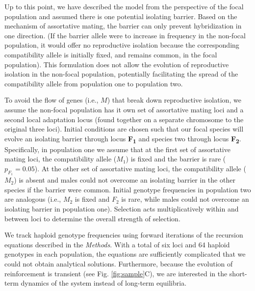 \documentclass[11pt]{article}
\begin{document}
Up to this point, we have described the model from the perspective of the focal population and assumed there is one potential isolating barrier. Based on the mechanism of assortative mating, the barrier can only prevent hybridization in one direction. (If the barrier allele were to increase in frequency in the non-focal population, it would offer no reproductive isolation because the corresponding compatibility allele is initially fixed, and remains common, in the focal population). This formulation does not allow the evolution of reproductive isolation in the non-focal population, potentially facilitating the spread of the compatibility allele from population one to population two. 

To avoid the flow of genes (i.e., $M$) that break down reproductive isolation, we assume the non-focal population has it own set of assortative mating loci and a second local adaptation locus (found together on a separate chromosome to the original three loci). Initial conditions are chosen such that our focal species will evolve an isolating barrier through locus \textbf{\texorpdfstring{F\textsubscript{1}}{F 1}} and species two through locus \textbf{\texorpdfstring{F\textsubscript{2}}{F 2}}. Specifically, in population one we assume that at the first set of assortative mating loci, the compatibility allele ($M_1$) is fixed and the barrier is rare ($p_{F_1} = 0.05$). At the other set of assortative mating loci, the compatibility allele ($M_2$) is absent and males could not overcome an isolating barrier in the other species if the barrier were common.  Initial genotype frequencies in population two are analogous (i.e., $M_2$ is fixed and $F_2$ is rare, while males could not overcome an isolating barrier in population one). Selection acts multiplicatively within and between loci to determine the overall strength of selection.  

We track haploid genotype frequencies using forward iterations of the recursion equations described in the \emph{Methods}.  With a total of six loci and 64 haploid genotypes in each population, the equations are sufficiently complicated that we could not obtain analytical solutions.  Furthermore, because the evolution of reinforcement is transient (see Fig. \ref{fig:sample}C), we are interested in the short-term dynamics of the system instead of long-term equilibria.  
\end{document}
